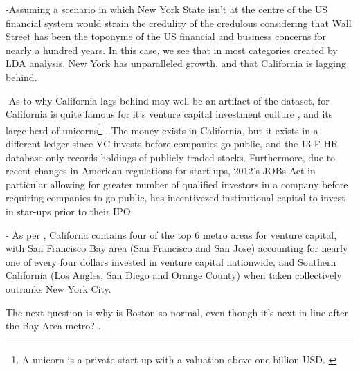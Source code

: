 -Assuming a scenario in which New York State isn't at the centre of the US financial system would strain the credulity of the credulous considering that Wall Street has been the toponyme of the US financial and business concerns for nearly a hundred years.  In this case, we see that in most categories created by LDA analysis, New York has unparalleled growth, and that California is lagging behind.  

-As to why California lags behind may well be an artifact of the dataset, for California is quite famous for it's venture capital investment culture \cite{greenventure2004}, and its large herd of unicorns\footnote{A unicorn is a private start-up with a valuation above one billion USD. \citep{Lee2013}} \cite{kenney2019unicorns}. The money exists in California, but it exists in a different ledger since VC invests before companies go public, and the 13-F HR database only records holdings of publicly traded stocks. Furthermore, due to recent changes in American regulations for start-ups, 2012's JOBs Act in particular allowing for greater number of qualified investors in a company before requiring companies to go public, has incentivezed institutional capital to invest in star-ups prior to their IPO.  

- As per \cite{florida2016rise}, Californa contains four of the top 6 metro areas for venture capital, with San Francisco Bay area (San Francisco and San Jose) accounting for nearly one of every four dollars invested in venture capital nationwide, and Southern California (Los Angles, San Diego and Orange County) when taken collectively outranks New York City. 

The next question is why is Boston so normal, even though it's next in line after the Bay Area metro?  
.   
